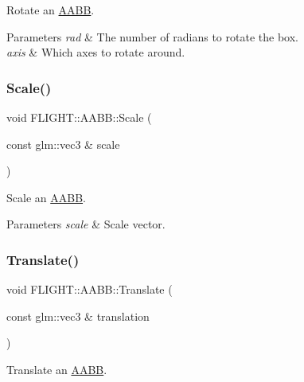 Rotate an \hyperlink{class_f_l_i_g_h_t_1_1_a_a_b_b}{A\+A\+BB}. 


\begin{DoxyParams}{Parameters}
{\em rad} & The number of radians to rotate the box. \\
\hline
{\em axis} & Which axes to rotate around. \\
\hline
\end{DoxyParams}
\mbox{\label{class_f_l_i_g_h_t_1_1_a_a_b_b_a8e3438c328d7d5138b64dfff165fb537}} 
\subsubsection{\texorpdfstring{Scale()}{Scale()}}
{\footnotesize\ttfamily void F\+L\+I\+G\+H\+T\+::\+A\+A\+B\+B\+::\+Scale (\begin{DoxyParamCaption}\item[{const glm\+::vec3 \&}]{scale }\end{DoxyParamCaption})}



Scale an \hyperlink{class_f_l_i_g_h_t_1_1_a_a_b_b}{A\+A\+BB}. 


\begin{DoxyParams}{Parameters}
{\em scale} & Scale vector. \\
\hline
\end{DoxyParams}
\mbox{\label{class_f_l_i_g_h_t_1_1_a_a_b_b_af2f31e6ad8deb78728e145a5ab5f9529}} 
\subsubsection{\texorpdfstring{Translate()}{Translate()}}
{\footnotesize\ttfamily void F\+L\+I\+G\+H\+T\+::\+A\+A\+B\+B\+::\+Translate (\begin{DoxyParamCaption}\item[{const glm\+::vec3 \&}]{translation }\end{DoxyParamCaption})}



Translate an \hyperlink{class_f_l_i_g_h_t_1_1_a_a_b_b}{A\+A\+BB}. 


